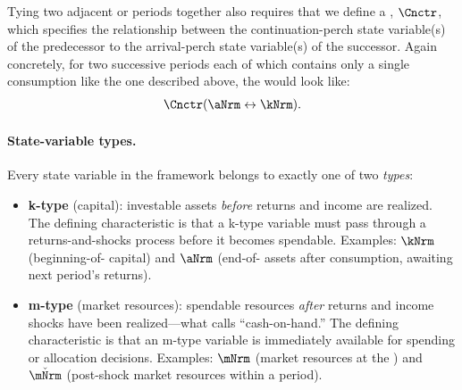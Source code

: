 \documentclass[SolvingMicroDSOPs]{subfiles}
\begin{document}
Tying two adjacent {\stgs} or periods together also requires that we define a {\Cnct}, ${\Cnctr}$, which specifies the relationship between the continuation-perch state variable(s) of the predecessor to the arrival-perch state variable(s) of the successor. Again concretely, for two successive periods each of which contains only a single consumption {\stg} like the one described above, the {\Cnct} would look like:
  \begin{equation}\begin{gathered}\begin{aligned} \label{eq:last-stg-v-is-end-prd-v} 
        \Cnctr(\aNrm \leftrightarrow \kNrm).
      \end{aligned}\end{gathered}\end{equation}

\hypertarget{state-variable-types}{}
\paragraph{State-variable types.}
Every state variable in the framework belongs to exactly one of two
\textit{types}:

\begin{itemize}
  \item \textbf{k-type} (capital): investable assets \textit{before}
    returns and income are realized. The defining characteristic is that
    a k-type variable must pass through a returns-and-shocks process
    before it becomes spendable. Examples: $\kNrm$
    (beginning-of-{\interval} capital) and $\aNrm$ (end-of-{\interval}
    assets after consumption, awaiting next period's returns).

  \item \textbf{m-type} (market resources): spendable resources
    \textit{after} returns and income shocks have been
    realized---what \citet{deatonUnderstandingC} calls ``cash-on-hand.''
    The defining characteristic is that an m-type variable is immediately
    available for spending or allocation decisions. Examples: $\mNrm$
    (market resources at the {\Decision} {\prch}) and $\check{\mNrm}$
    (post-shock market resources within a period).
\end{itemize}
\end{document}
